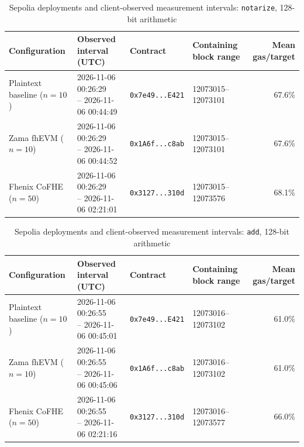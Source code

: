 \begin{table}[!t]
\caption{Sepolia deployments and client-observed measurement intervals: \texttt{notarize}, 128-bit arithmetic}
\label{tab:sepolia-client-intervals-classic-euint128-notarize}
\centering
\footnotesize
\setlength{\tabcolsep}{4pt}
\begin{tabular}{|l|l|l|l|r|}
\hline
\textbf{Configuration} &
\textbf{Observed interval (UTC)} &
\textbf{Contract} &
\textbf{Containing block range} &
\textbf{Mean gas/target} \\
\hline
Plaintext baseline (\(n=10\)) &
\shortstack[l]{2026-11-06 00:26:29 \\ -- 2026-11-06 00:44:49} &
\texttt{0x7e49...E421} &
12073015--12073101 &
67.6\% \\
\hline
Zama fhEVM (\(n=10\)) &
\shortstack[l]{2026-11-06 00:26:29 \\ -- 2026-11-06 00:44:52} &
\texttt{0x1A6f...c8ab} &
12073015--12073101 &
67.6\% \\
\hline
Fhenix CoFHE (\(n=50\)) &
\shortstack[l]{2026-11-06 00:26:29 \\ -- 2026-11-06 02:21:01} &
\texttt{0x3127...310d} &
12073015--12073576 &
68.1\% \\
\hline
\end{tabular}
\end{table}

\begin{table}[!t]
\caption{Sepolia deployments and client-observed measurement intervals: \texttt{add}, 128-bit arithmetic}
\label{tab:sepolia-client-intervals-classic-euint128-add}
\centering
\footnotesize
\setlength{\tabcolsep}{4pt}
\begin{tabular}{|l|l|l|l|r|}
\hline
\textbf{Configuration} &
\textbf{Observed interval (UTC)} &
\textbf{Contract} &
\textbf{Containing block range} &
\textbf{Mean gas/target} \\
\hline
Plaintext baseline (\(n=10\)) &
\shortstack[l]{2026-11-06 00:26:55 \\ -- 2026-11-06 00:45:01} &
\texttt{0x7e49...E421} &
12073016--12073102 &
61.0\% \\
\hline
Zama fhEVM (\(n=10\)) &
\shortstack[l]{2026-11-06 00:26:55 \\ -- 2026-11-06 00:45:06} &
\texttt{0x1A6f...c8ab} &
12073016--12073102 &
61.0\% \\
\hline
Fhenix CoFHE (\(n=50\)) &
\shortstack[l]{2026-11-06 00:26:55 \\ -- 2026-11-06 02:21:16} &
\texttt{0x3127...310d} &
12073016--12073577 &
66.0\% \\
\hline
\end{tabular}
\end{table}

